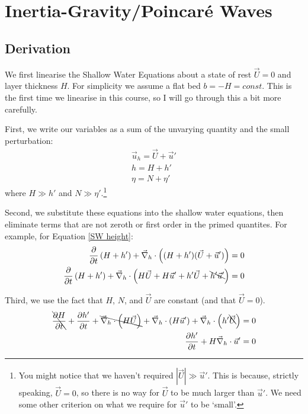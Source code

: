 \section{Inertia-Gravity/Poincaré Waves}\label{2D Poincare}

\subsection{Derivation}

We first linearise the Shallow Water Equations about a state of rest $\vec{U}=0$ and layer thickness $H$. For simplicity we assume a flat bed $b=-H=const$. This is the first time we linearise in this course, so I will go through this a bit more carefully.

First, we write our variables as a sum of the unvarying quantity and the small perturbation:
\begin{align*}
    \vec{u}_h=\vec{U}+\vec{u}'\\
    h = H + h'\\
    \eta = N + \eta'
\end{align*}
where $H\gg h'$ and $N\gg \eta'$.\footnote{
    You might notice that we haven't required $|\vec{U}|\gg \vec{u}'$. This is because, strictly speaking, $\vec{U}=0$, so there is no way for $\vec{U}$ to be much larger than $\vec{u}'$. We need some other criterion on what we require for $\vec{u}'$ to be `small'.
}

Second, we substitute these equations into the shallow water equations, then eliminate terms that are not zeroth or first order in the primed quantites. For example, for Equation \ref{SW height}:
\begin{align*}
    \frac{\partial}{\partial t}\left( H+h' \right)+\vec{\nabla}_h\cdot \left( (H+h')(\vec{U}+\vec{u}') \right)=0\\
    \frac{\partial}{\partial t}\left( H+h' \right)+\vec{\nabla}_h\cdot \left( H\vec{U}+H\vec{u}'+h'\vec{U}+\bcancel{h'\vec{u}'} \right)=0
\end{align*}

Third, we use the fact that $H$, $N$, and $\vec{U}$ are constant (and that $\vec{U}=0$).
\begin{align*}
    \bcancel{\frac{\partial H}{\partial t}}+ \frac{\partial h'}{\partial t}+\bcancel{\vec{\nabla}_h\cdot \left( H\vec{U} \right)}+\vec{\nabla}_h\cdot \left(H\vec{u}'\right)+\vec{\nabla}_h\cdot \left(h'\bcancel{\vec{U}} \right)=0\\
    \frac{\partial h'}{\partial t}+H\vec{\nabla}_h\cdot\vec{u}'=0
\end{align*}


